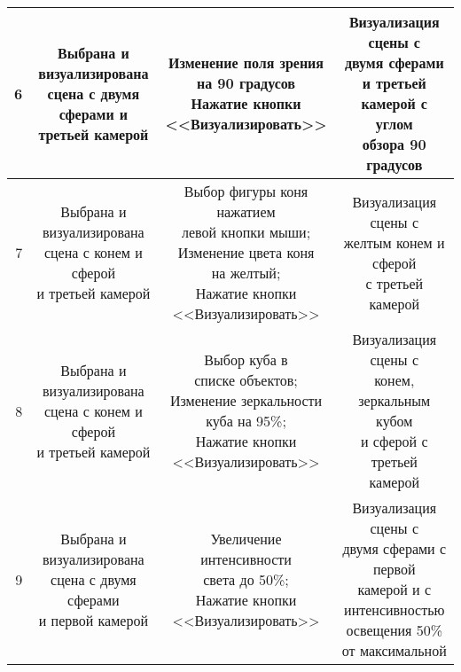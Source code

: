 \begin{longtable}{|r|c|c|c|}
	6 & \makecell{Выбрана и \\визуализирована \\сцена с двумя сферами и \\третьей камерой} & \makecell{Изменение поля зрения\\на 90 градусов\\Нажатие кнопки\\<<Визуализировать>>} & \makecell{Визуализация сцены с \\двумя сферами и третьей\\камерой с углом\\обзора 90 градусов} \\ \hline
	7 & \makecell{Выбрана и \\визуализирована \\сцена с конем и сферой\\и третьей камерой} & \makecell{Выбор фигуры коня нажатием\\левой кнопки мыши;\\Изменение цвета коня\\на желтый;\\Нажатие кнопки\\<<Визуализировать>>} & \makecell{Визуализация сцены с \\желтым конем и сферой\\с третьей камерой} \\ \hline
	8 & \makecell{Выбрана и \\визуализирована \\сцена с конем и сферой\\и третьей камерой} & \makecell{Выбор куба в \\списке объектов;\\Изменение зеркальности\\куба на 95\%;\\Нажатие кнопки\\<<Визуализировать>>} & \makecell{Визуализация сцены с \\конем, зеркальным кубом\\ и сферой с третьей\\камерой} \\ \hline
	9 & \makecell{Выбрана и \\визуализирована \\сцена с двумя сферами\\и первой камерой} & \makecell{Увеличение интенсивности \\света до 50\%;\\Нажатие кнопки\\<<Визуализировать>>} & \makecell{Визуализация сцены с \\двумя сферами с первой\\камерой и с \\интенсивностью\\ освещения 50\% \\от максимальной} \\ \hline

\end{longtable}
